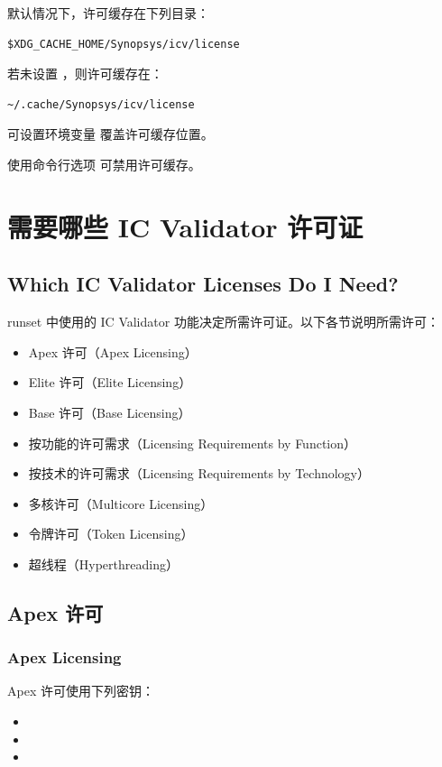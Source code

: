 默认情况下，许可缓存在下列目录：
\begin{lstlisting}
$XDG_CACHE_HOME/Synopsys/icv/license
\end{lstlisting}

若未设置 ，则许可缓存在：
\begin{lstlisting}
~/.cache/Synopsys/icv/license
\end{lstlisting}

可设置环境变量  覆盖许可缓存位置。

使用命令行选项  可禁用许可缓存。

\section{需要哪些 IC Validator 许可证}
\subsection*{Which IC Validator Licenses Do I Need?}

runset 中使用的 IC Validator 功能决定所需许可证。以下各节说明所需许可：
\begin{itemize}
  \item Apex 许可（Apex Licensing）
  \item Elite 许可（Elite Licensing）
  \item Base 许可（Base Licensing）
  \item 按功能的许可需求（Licensing Requirements by Function）
  \item 按技术的许可需求（Licensing Requirements by Technology）
  \item 多核许可（Multicore Licensing）
  \item 令牌许可（Token Licensing）
  \item 超线程（Hyperthreading）
\end{itemize}

\subsection{Apex 许可}
\subsubsection*{Apex Licensing}

Apex 许可使用下列密钥：
\begin{itemize}
  \item {}
  \item {}
  \item {}
\end{itemize}

